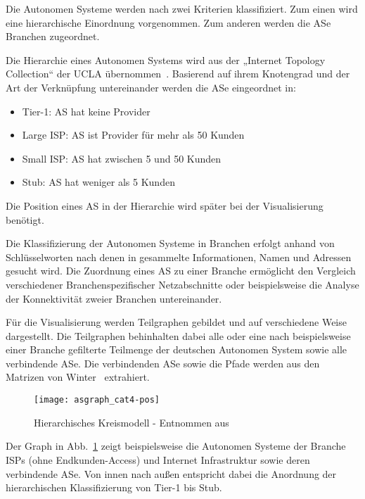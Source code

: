 Die Autonomen Systeme werden nach zwei Kriterien klassifiziert.
Zum einen wird eine hierarchische Einordnung vorgenommen.
Zum anderen werden die ASe Branchen zugeordnet.

Die Hierarchie eines Autonomen Systems wird aus der „Internet Topology Collection“ der UCLA übernommen~\cite{ucla-topology}.
Basierend auf ihrem Knotengrad und der Art der Verknüpfung untereinander werden die ASe eingeordnet in:
\begin{itemize}
  \item Tier-1: AS hat keine Provider
  \item Large ISP: AS ist Provider für mehr als 50 Kunden
  \item Small ISP: AS hat zwischen 5 und 50 Kunden
  \item Stub: AS hat weniger als 5 Kunden
\end{itemize}
Die Position eines AS in der Hierarchie wird später bei der Visualisierung benötigt.

Die Klassifizierung der Autonomen Systeme in Branchen erfolgt anhand von Schlüsselworten nach denen in gesammelte Informationen, Namen und Adressen gesucht wird.
Die Zuordnung eines AS zu einer Branche ermöglicht den Vergleich verschiedener Branchenspezifischer Netzabschnitte oder beispielsweise die Analyse der Konnektivität zweier Branchen untereinander.

Für die Visualisierung werden Teilgraphen gebildet und auf verschiedene Weise dargestellt.
Die Teilgraphen behinhalten dabei alle oder eine nach beispielsweise einer Branche gefilterte Teilmenge der deutschen Autonomen System sowie alle verbindende ASe.
Die verbindenden ASe sowie die Pfade werden aus den Matrizen von Winter~\cite{Winter:2009:MIR:1577959.1577976} extrahiert.

\begin{figure}
  \begin{center}
    \texttt{[image: asgraph\_cat4-pos]}
    \caption{Hierarchisches Kreismodell - Entnommen aus~\cite{swbh-rsved-11}} \label{asgraph}
  \end{center}
\end{figure}

Der Graph in Abb.~\ref{asgraph} zeigt beispielsweise die Autonomen Systeme der Branche ISPs (ohne Endkunden-Access) und Internet Infrastruktur sowie deren verbindende ASe.
Von innen nach außen entspricht dabei die Anordnung der hierarchischen Klassifizierung von Tier-1 bis Stub.
